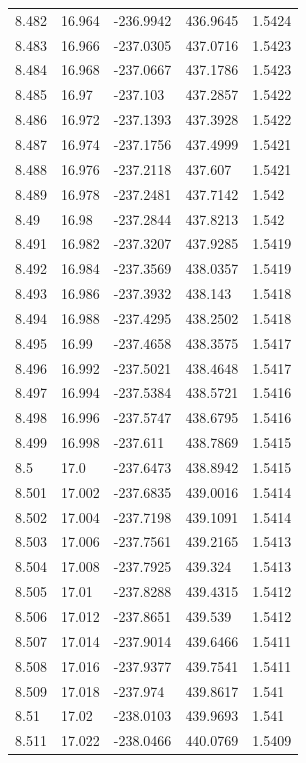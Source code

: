 \begin{tabular}{lllll}
8.482 & 16.964 & -236.9942 & 436.9645 & 1.5424 \\
8.483 & 16.966 & -237.0305 & 437.0716 & 1.5423 \\
8.484 & 16.968 & -237.0667 & 437.1786 & 1.5423 \\
8.485 & 16.97 & -237.103 & 437.2857 & 1.5422 \\
8.486 & 16.972 & -237.1393 & 437.3928 & 1.5422 \\
8.487 & 16.974 & -237.1756 & 437.4999 & 1.5421 \\
8.488 & 16.976 & -237.2118 & 437.607 & 1.5421 \\
8.489 & 16.978 & -237.2481 & 437.7142 & 1.542 \\
8.49 & 16.98 & -237.2844 & 437.8213 & 1.542 \\
8.491 & 16.982 & -237.3207 & 437.9285 & 1.5419 \\
8.492 & 16.984 & -237.3569 & 438.0357 & 1.5419 \\
8.493 & 16.986 & -237.3932 & 438.143 & 1.5418 \\
8.494 & 16.988 & -237.4295 & 438.2502 & 1.5418 \\
8.495 & 16.99 & -237.4658 & 438.3575 & 1.5417 \\
8.496 & 16.992 & -237.5021 & 438.4648 & 1.5417 \\
8.497 & 16.994 & -237.5384 & 438.5721 & 1.5416 \\
8.498 & 16.996 & -237.5747 & 438.6795 & 1.5416 \\
8.499 & 16.998 & -237.611 & 438.7869 & 1.5415 \\
8.5 & 17.0 & -237.6473 & 438.8942 & 1.5415 \\
8.501 & 17.002 & -237.6835 & 439.0016 & 1.5414 \\
8.502 & 17.004 & -237.7198 & 439.1091 & 1.5414 \\
8.503 & 17.006 & -237.7561 & 439.2165 & 1.5413 \\
8.504 & 17.008 & -237.7925 & 439.324 & 1.5413 \\
8.505 & 17.01 & -237.8288 & 439.4315 & 1.5412 \\
8.506 & 17.012 & -237.8651 & 439.539 & 1.5412 \\
8.507 & 17.014 & -237.9014 & 439.6466 & 1.5411 \\
8.508 & 17.016 & -237.9377 & 439.7541 & 1.5411 \\
8.509 & 17.018 & -237.974 & 439.8617 & 1.541 \\
8.51 & 17.02 & -238.0103 & 439.9693 & 1.541 \\
8.511 & 17.022 & -238.0466 & 440.0769 & 1.5409 \\

\end{tabular}
